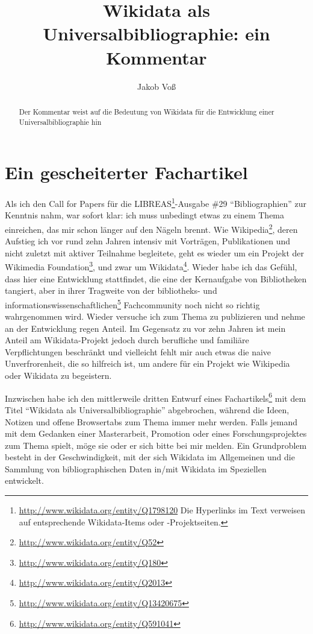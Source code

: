 \documentclass[a4paper,
fontsize=11pt,
oneside,
numbers=noperiodatend,
parskip=half-,
bibliography=totoc,
final
]{scrartcl}
\title{\LARGE{Wikidata als Universalbibliographie: ein Kommentar}} %
\author{Jakob Voß} %
\date{}
\begin{document}
\maketitle
\thispagestyle{fancyplain} 

\begin{abstract}
Der Kommentar weist auf die Bedeutung von Wikidata für die Entwicklung
einer Universalbibliographie hin
\end{abstract}

\section*{Ein gescheiterter
Fachartikel}\label{ein-gescheiterter-fachartikel}

Als ich den Call for Papers für die LIBREAS\footnote{\url{http://www.wikidata.org/entity/Q1798120}
  Die Hyperlinks im Text verweisen auf entsprechende Wikidata-Items oder
  -Projektseiten.}-Ausgabe \#29 \enquote{Bibliographien} zur Kenntnis
nahm, war sofort klar: ich muss unbedingt etwas zu einem Thema
einreichen, das mir schon länger auf den Nägeln brennt. Wie
Wikipedia\footnote{\url{http://www.wikidata.org/entity/Q52}}, deren
Aufstieg ich vor rund zehn Jahren intensiv mit Vorträgen, Publikationen
und nicht zuletzt mit aktiver Teilnahme begleitete, geht es wieder um
ein Projekt der Wikimedia Foundation\footnote{\url{http://www.wikidata.org/entity/Q180}},
und zwar um Wikidata\footnote{\url{http://www.wikidata.org/entity/Q2013}}.
Wieder habe ich das Gefühl, dass hier eine Entwicklung stattfindet, die
eine der Kernaufgabe von Bibliotheken tangiert, aber in ihrer Tragweite
von der bibliotheks- und informationswissenschaftlichen\footnote{\url{http://www.wikidata.org/entity/Q13420675}}
Fachcommunity noch nicht so richtig wahrgenommen wird. Wieder versuche
ich zum Thema zu publizieren und nehme an der Entwicklung regen Anteil.
Im Gegensatz zu vor zehn Jahren ist mein Anteil am Wikidata-Projekt
jedoch durch berufliche und familiäre Verpflichtungen beschränkt und
vielleicht fehlt mir auch etwas die naive Unverfrorenheit, die so
hilfreich ist, um andere für ein Projekt wie Wikipedia oder Wikidata zu
begeistern.

Inzwischen habe ich den mittlerweile dritten Entwurf eines
Fachartikels\footnote{\url{http://www.wikidata.org/entity/Q591041}} mit
dem Titel \enquote{Wikidata als Universalbibliographie} abgebrochen,
während die Ideen, Notizen und offene Browsertabs zum Thema immer mehr
werden. Falls jemand mit dem Gedanken einer Masterarbeit, Promotion oder
eines Forschungsprojektes zum Thema spielt, möge sie oder er sich bitte
bei mir melden. Ein Grundproblem besteht in der Geschwindigkeit, mit der
sich Wikidata im Allgemeinen und die Sammlung von bibliographischen
Daten in/mit Wikidata im Speziellen entwickelt.
\end{document}
